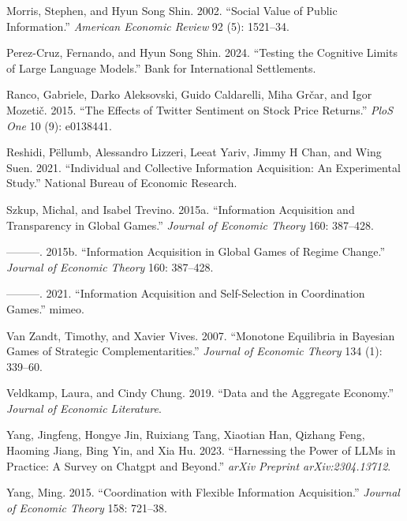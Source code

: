 \documentclass[
]{article}
\newlength{\cslhangindent}
\newenvironment{CSLReferences}[2] %
 {\begin{list}{}{%
  \setlength{\itemindent}{0pt}
  \setlength{\leftmargin}{0pt}
  \setlength{\parsep}{0pt}
  \ifodd #1
   \setlength{\leftmargin}{\cslhangindent}
   \setlength{\itemindent}{-1\cslhangindent}
  \fi
  \setlength{\itemsep}{#2\baselineskip}}}
 {\end{list}}
\theoremstyle{plain}
\theoremstyle{definition}
\theoremstyle{remark}
\begin{document}
\begin{CSLReferences}{1}{0}
Morris, Stephen, and Hyun Song Shin. 2002. {``Social Value of Public
Information.''} \emph{American Economic Review} 92 (5): 1521--34.

Perez-Cruz, Fernando, and Hyun Song Shin. 2024. {``Testing the Cognitive
Limits of Large Language Models.''} Bank for International Settlements.

Ranco, Gabriele, Darko Aleksovski, Guido Caldarelli, Miha Grčar, and
Igor Mozetič. 2015. {``The Effects of Twitter Sentiment on Stock Price
Returns.''} \emph{PloS One} 10 (9): e0138441.

Reshidi, Pëllumb, Alessandro Lizzeri, Leeat Yariv, Jimmy H Chan, and
Wing Suen. 2021. {``Individual and Collective Information Acquisition:
An Experimental Study.''} National Bureau of Economic Research.

Szkup, Michal, and Isabel Trevino. 2015a. {``Information Acquisition and
Transparency in Global Games.''} \emph{Journal of Economic Theory} 160:
387--428.

---------. 2015b. {``Information Acquisition in Global Games of Regime
Change.''} \emph{Journal of Economic Theory} 160: 387--428.

---------. 2021. {``Information Acquisition and Self-Selection in
Coordination Games.''} mimeo.

Van Zandt, Timothy, and Xavier Vives. 2007. {``Monotone Equilibria in
Bayesian Games of Strategic Complementarities.''} \emph{Journal of
Economic Theory} 134 (1): 339--60.

Veldkamp, Laura, and Cindy Chung. 2019. {``Data and the Aggregate
Economy.''} \emph{Journal of Economic Literature}.

Yang, Jingfeng, Hongye Jin, Ruixiang Tang, Xiaotian Han, Qizhang Feng,
Haoming Jiang, Bing Yin, and Xia Hu. 2023. {``Harnessing the Power of
LLMs in Practice: A Survey on Chatgpt and Beyond.''} \emph{arXiv
Preprint arXiv:2304.13712}.

Yang, Ming. 2015. {``Coordination with Flexible Information
Acquisition.''} \emph{Journal of Economic Theory} 158: 721--38.

\end{CSLReferences}
\end{document}
